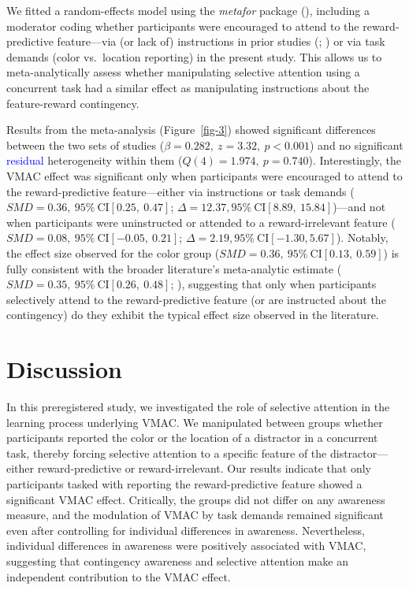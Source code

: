 \documentclass[
  man,
  floatsintext,
  longtable,
  nolmodern,
  notxfonts,
  notimes,
  mask,
  colorlinks=true,linkcolor=blue,citecolor=blue,urlcolor=blue]{apa7}
\begin{document}
We fitted a random-effects model using the \emph{metafor} package
(), including a moderator
coding whether participants were encouraged to attend to the
reward-predictive feature---via (or lack of) instructions in prior
studies (;
)
or via task demands (color vs.~location reporting) in the present study.
This allows us to meta-analytically assess whether manipulating
selective attention using a concurrent task had a similar effect as
manipulating instructions about the feature-reward contingency.

Results from the meta-analysis (Figure~\ref{fig-3}) showed significant
differences between the two sets of studies
(\(\beta = 0.282,\ z = 3.32,\ p < 0.001\)) and no significant
\textcolor{blue}{residual} heterogeneity within them
(\(Q(4) = 1.974,\ p = 0.740\)). Interestingly, the VMAC effect was
significant only when participants were encouraged to attend to the
reward-predictive feature---either via instructions or task demands
(\(\mathit{SMD}=0.36, \ 95\% \ \text{CI} [0.25, \ 0.47]\);
\(\Delta = 12.37, 95\% \ \text{CI} [8.89, \ 15.84]\))---and not when
participants were uninstructed or attended to a reward-irrelevant
feature (\(\mathit{SMD}=0.08, \ 95\% \ \text{CI} [-0.05, \ 0.21]\);
\(\Delta = 2.19, 95\% \ \text{CI} [-1.30,5.67]\)). Notably, the effect
size observed for the color group
(\(\mathit{SMD}=0.36, \ 95\% \ \text{CI}[0.13, \ 0.59]\)) is fully
consistent with the broader literature's meta-analytic estimate
(\(\mathit{SMD}=0.35, \ 95\% \  \text{CI} [0.26, \ 0.48]\);
), suggesting that only when
participants selectively attend to the reward-predictive feature (or are
instructed about the contingency) do they exhibit the typical effect
size observed in the literature.

\section{Discussion}\label{discussion}

In this preregistered study, we investigated the role of selective
attention in the learning process underlying VMAC. We manipulated
between groups whether participants reported the color or the location
of a distractor in a concurrent task, thereby forcing selective
attention to a specific feature of the distractor---either
reward-predictive or reward-irrelevant. Our results indicate that only
participants tasked with reporting the reward-predictive feature showed
a significant VMAC effect. Critically, the groups did not differ on any
awareness measure, and the modulation of VMAC by task demands remained
significant even after controlling for individual differences in
awareness. Nevertheless, individual differences in awareness were
positively associated with VMAC, suggesting that contingency awareness
and selective attention make an independent contribution to the VMAC
effect.
\end{document}
